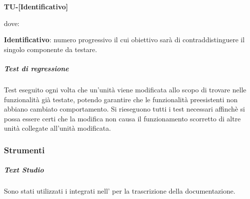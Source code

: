                             \begin{center}
                            \textbf{TU-[Identificativo]}
                            \end{center}
                            dove:

                            \textbf{Identificativo}: numero progressivo il cui obiettivo sarà di contraddistinguere il singolo componente da testare.

                    \subparagraph*{Test di regressione}
        				Test eseguito ogni volta che un'unità viene modificata allo scopo di trovare  nelle funzionalità già testate, potendo garantire che le funzionalità preesistenti non abbiano cambiato comportamento. Si rieseguono tutti i test necessari affinchè si possa essere certi che la modifica non causa il funzionamento scorretto di altre unità collegate all'unità modificata.

                \subsubsection{Strumenti}
                    \subparagraph{Text Studio}
            	        Sono stati utilizzati i  integrati nell'  per la trascrizione della documentazione.